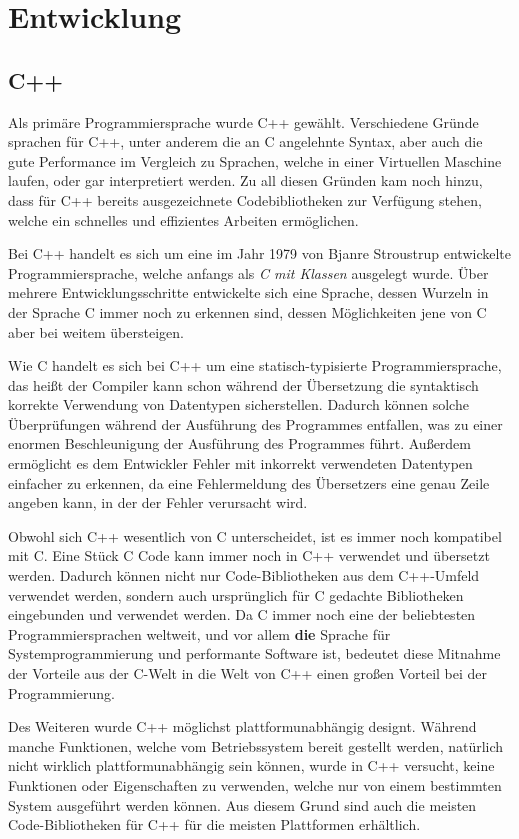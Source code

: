 \section{Entwicklung}

\subsection{C++}
Als primäre Programmiersprache wurde C++ gewählt. Verschiedene Gründe sprachen für C++, unter anderem die an C angelehnte Syntax, aber
auch die gute Performance im Vergleich zu Sprachen, welche in einer Virtuellen Maschine laufen, oder gar interpretiert werden. Zu 
all diesen Gründen kam noch hinzu, dass für C++ bereits ausgezeichnete Codebibliotheken zur Verfügung stehen, welche ein schnelles
und effizientes Arbeiten ermöglichen.

Bei C++ handelt es sich um eine im Jahr 1979 von Bjanre Stroustrup entwickelte Programmiersprache, welche anfangs als \textit{C mit Klassen}
ausgelegt wurde. Über mehrere Entwicklungsschritte entwickelte sich eine Sprache, dessen Wurzeln in der Sprache C immer noch zu erkennen sind, 
dessen Möglichkeiten jene von C aber bei weitem übersteigen. 

Wie C handelt es sich bei C++ um eine statisch-typisierte Programmiersprache, das heißt der Compiler kann schon während der Übersetzung die
syntaktisch korrekte Verwendung von Datentypen sicherstellen. Dadurch können solche Überprüfungen während der Ausführung des Programmes
entfallen, was zu einer enormen Beschleunigung der Ausführung des Programmes führt. Außerdem ermöglicht es dem Entwickler Fehler mit
inkorrekt verwendeten Datentypen einfacher zu erkennen, da eine Fehlermeldung des Übersetzers eine genau Zeile angeben kann, in der 
der Fehler verursacht wird. 

Obwohl sich C++ wesentlich von C unterscheidet, ist es immer noch kompatibel mit C. Eine Stück C Code kann immer noch in C++ verwendet und
übersetzt werden. Dadurch können nicht nur Code-Bibliotheken aus dem C++-Umfeld verwendet werden, sondern auch ursprünglich für C gedachte
Bibliotheken eingebunden und verwendet werden. Da C immer noch eine der beliebtesten Programmiersprachen weltweit, und vor allem \textbf{die}
Sprache für Systemprogrammierung und performante Software ist, bedeutet diese Mitnahme der Vorteile aus der C-Welt in die Welt von C++
einen großen Vorteil bei der Programmierung.

Des Weiteren wurde C++ möglichst plattformunabhängig designt. Während manche Funktionen, welche vom Betriebssystem bereit gestellt werden, 
natürlich nicht wirklich plattformunabhängig sein können, wurde in C++ versucht, keine Funktionen oder Eigenschaften zu verwenden, welche
nur von einem bestimmten System ausgeführt werden können. Aus diesem Grund sind auch die meisten Code-Bibliotheken für C++ für die meisten
Plattformen erhältlich. 

